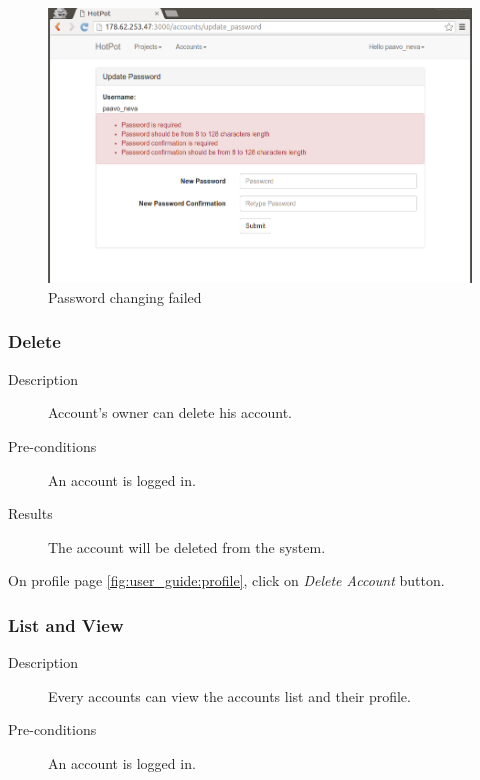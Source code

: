 \begin{figure}[bth]                                                                                                                                                  \myfloatalign
\includegraphics[width=1.0\linewidth]{gfx/chapter_5/account/change_password_failed}
\caption[Password changing failed]{Password changing failed}
\label{fig:user_guide:account:change_password_failed}
\end{figure}

\clearpage

\subsubsection{Delete}
\label{ch:appendix-a:user_guide:account:delete}

\begin{description}
\item[Description] Account's owner can delete his account.
\item[Pre-conditions] An account is logged in.
\item[Results] The account will be deleted from the system.
\end{description}

On profile page \autoref{fig:user_guide:profile}, click on \emph{Delete Account} button.

\subsubsection{List and View}
\label{ch:appendix-a:user_guide:account:list}

\begin{description}
\item[Description] Every accounts can view the accounts list and their profile.
\item[Pre-conditions] An account is logged in.
\end{description}

